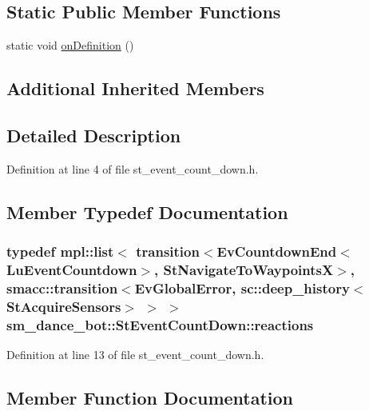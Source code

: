 \subsection*{Static Public Member Functions}
\begin{DoxyCompactItemize}
\item 
static void \hyperlink{structsm__dance__bot_1_1StEventCountDown_a93bb32fa9321d2babd851833eac44a6f}{on\+Definition} ()
\end{DoxyCompactItemize}
\subsection*{Additional Inherited Members}


\subsection{Detailed Description}


Definition at line 4 of file st\+\_\+event\+\_\+count\+\_\+down.\+h.



\subsection{Member Typedef Documentation}
\subsubsection[{\texorpdfstring{reactions}{reactions}}]{\setlength{\rightskip}{0pt plus 5cm}typedef mpl\+::list$<$ transition$<$Ev\+Countdown\+End$<$Lu\+Event\+Countdown$>$, {\bf St\+Navigate\+To\+WaypointsX}$>$, {\bf smacc\+::transition}$<${\bf Ev\+Global\+Error}, sc\+::deep\+\_\+history$<${\bf St\+Acquire\+Sensors}$>$ $>$ $>$ {\bf sm\+\_\+dance\+\_\+bot\+::\+St\+Event\+Count\+Down\+::reactions}}\hypertarget{structsm__dance__bot_1_1StEventCountDown_a1dda165c92b9e4dfb9f3bf4e5db4c90d}{}\label{structsm__dance__bot_1_1StEventCountDown_a1dda165c92b9e4dfb9f3bf4e5db4c90d}


Definition at line 13 of file st\+\_\+event\+\_\+count\+\_\+down.\+h.



\subsection{Member Function Documentation}
